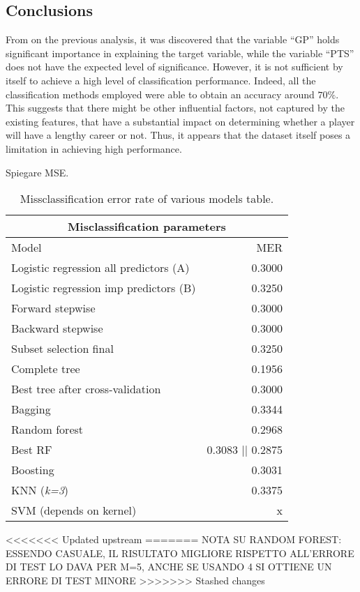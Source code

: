\subsection{Conclusions}

From on the previous analysis, it was discovered that the variable ``GP'' holds significant importance in explaining the target variable, while the variable ``PTS'' does not have the expected level of significance. 
However, it is not sufficient by itself to achieve a high level of classification performance.
Indeed, all the classification methods employed were able to obtain an accuracy around $70\%$. This suggests that there might be other influential factors, not captured by the existing features, that have a substantial impact on determining whether a player will have a lengthy career or not. Thus, it appears that the dataset itself poses a limitation in achieving high performance.

Spiegare MSE.

\begin{table}[H]
	\centering
	\begin{tabular}{|| l | r ||} 
		\hline
		\multicolumn{2}{|c|}{Misclassification parameters} \\
		\hline
		Model & MER \\
		\hline
		Logistic regression all predictors (A) & 0.3000 \\
		\hline
		Logistic regression imp predictors (B) & 0.3250 \\
		\hline
		Forward stepwise & 0.3000 \\
		\hline
		Backward stepwise & 0.3000 \\
		\hline
		Subset selection final & 0.3250 \\
		\hline
		Complete tree & 0.1956 \\
		\hline
		Best tree after cross-validation & 0.3000 \\ 
		\hline
		Bagging & 0.3344 \\
		\hline
		Random forest & 0.2968 \\
		\hline
		Best RF & 0.3083 || 0.2875 \\
		\hline
		Boosting & 0.3031 \\
		\hline
		KNN (\textit{k=3}) & 0.3375 \\
		\hline
		SVM (depends on kernel)& x \\
		\hline
	\end{tabular}
	\caption{Missclassification error rate of various models table.}
	\label{table:ClasEvalParams}
\end{table}

<<<<<<< Updated upstream
=======
NOTA SU RANDOM FOREST: ESSENDO CASUALE, IL RISULTATO MIGLIORE RISPETTO ALL'ERRORE DI TEST LO DAVA PER M=5, ANCHE SE USANDO 4 SI OTTIENE UN ERRORE DI TEST MINORE
>>>>>>> Stashed changes
